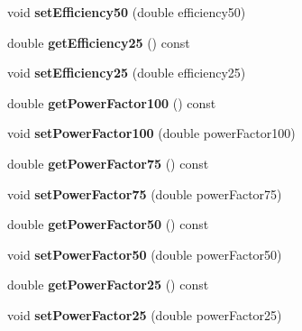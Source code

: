 \begin{DoxyCompactItemize}
\mbox{\label{class_motor_data_aad6febd24d17e5f9cfc829666cb3c3a2}} 
void {\bfseries set\+Efficiency50} (double efficiency50)
\item 
\mbox{\label{class_motor_data_a9da44e426e9a386a5d16e1ccffa3f8a1}} 
double {\bfseries get\+Efficiency25} () const
\item 
\mbox{\label{class_motor_data_a89d6e254b34ba81f80b756bb51cd66f6}} 
void {\bfseries set\+Efficiency25} (double efficiency25)
\item 
\mbox{\label{class_motor_data_a250e44c87517fe1ac4b127db48b07300}} 
double {\bfseries get\+Power\+Factor100} () const
\item 
\mbox{\label{class_motor_data_a8bbfc74cd323a44ea8aa5453e3cd4895}} 
void {\bfseries set\+Power\+Factor100} (double power\+Factor100)
\item 
\mbox{\label{class_motor_data_a47bd751614504069a1cc0792be5f6105}} 
double {\bfseries get\+Power\+Factor75} () const
\item 
\mbox{\label{class_motor_data_a8cb9fb1696d9d28ad65f7d1e27128d7f}} 
void {\bfseries set\+Power\+Factor75} (double power\+Factor75)
\item 
\mbox{\label{class_motor_data_ac154d54db217e67590e9fdc4ec40b628}} 
double {\bfseries get\+Power\+Factor50} () const
\item 
\mbox{\label{class_motor_data_a9fa35a7a40a0f9b96d1d9dad8dcf9a43}} 
void {\bfseries set\+Power\+Factor50} (double power\+Factor50)
\item 
\mbox{\label{class_motor_data_acf9931c536b579c9f8700411e74456db}} 
double {\bfseries get\+Power\+Factor25} () const
\item 
\mbox{\label{class_motor_data_abf58c754c83b355e9b478401a441c4a2}} 
void {\bfseries set\+Power\+Factor25} (double power\+Factor25)
\item 
\mbox{\label{class_motor_data_a34d236d6b1ef4228e7dd0784bbd0245d}} 

\end{DoxyCompactItemize}
